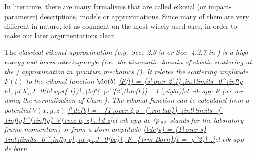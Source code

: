
In literature, there are many formalisms that are called eikonal (or impact-parameter) descriptions, models or approximations. Since many of them are very different in nature, let us comment on the most widely used ones, in order to make our later argumentations clear.

The \em{classical eikonal approximation} (e.g.~Sec.~2.3 in  or Sec.~4.2.7 in ) is a high-energy and low-scattering-angle (i.e.~the kinematic domain of elastic scattering at the ) approximation in quantum mechanics (). It relates the scattering amplitude $F(t)$ to the eikonal function $\de(b)$
\eqref{F(t) = {s\over 2\i}\int\limits_0^\infty b\,\d b\,J_0(b\sqrt{-t})\,\left( \e^{2\i\de(b)} - 1 \right)}{el eik app F}
(we are using the normalization of Cahn ). The \em{eikonal} function can be calculated from a potential $V(x, y, z)$
\eqref{\de(b) = - {1\over 4 p_{\rm lab}} \int\limits_{-\infty}^{\infty} V(\vec b, z)\ \d z}{el eik app de}
($p_{\rm lab}$ stands for the laboratory-frame momentum) or from a Born amplitude
\eqref{\de(b) = {1\over s} \int\limits_0^\infty q\,\d q\,J_0(bq)\, F_{\rm Born}(t = -q^2)\ .}{el eik app de born}

